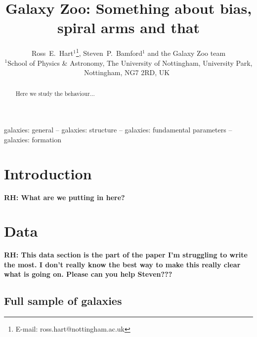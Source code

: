 \documentclass[useAMS,usenatbib]{mn2e}
\newcommand{\rh}[1]{{\bf \textcolor{RoyalPurple}{RH: #1}}}
\begin{document}
\title{Galaxy Zoo: Something about bias, spiral arms and that}
\author[Hart et al.]{Ross~E.~Hart$^1$\thanks{E-mail: ross.hart@nottingham.ac.uk}, Steven~P.~Bamford$^1$ and the Galaxy Zoo team
\smallskip\\
$^{1}$School of Physics \& Astronomy, The University of Nottingham, University Park, Nottingham, NG7 2RD, UK\
}
\maketitle
\begin{abstract}
Here we study the behaviour...
\end{abstract}

\begin{keywords}
galaxies: general -- galaxies: structure -- galaxies: fundamental parameters -- galaxies: formation
\end{keywords}

\section{Introduction}
\label{sec:intro}

\rh{What are we putting in here?}

\section{Data}
\label{sec:data}

\rh{This data section is the part of the paper I'm struggling to write the most. I don't really know the best way to make this really clear what is going on. Please can you help Steven???}

\subsection{Full sample of galaxies}
\end{document}
